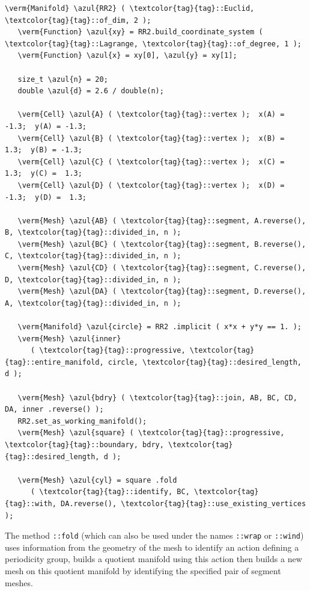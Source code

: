 \begin{Verbatim}[commandchars=\\\{\},formatcom=\small\tt,frame=single,
   label=parag-\ref{\numb section 7.\numb parag 16}.cpp,rulecolor=\color{coment},
   baselinestretch=0.94,framesep=2mm                                             ]
   \verm{Manifold} \azul{RR2} ( \textcolor{tag}{tag}::Euclid, \textcolor{tag}{tag}::of_dim, 2 );
   \verm{Function} \azul{xy} = RR2.build_coordinate_system ( \textcolor{tag}{tag}::Lagrange, \textcolor{tag}{tag}::of_degree, 1 );
   \verm{Function} \azul{x} = xy[0], \azul{y} = xy[1];

   size_t \azul{n} = 20;
   double \azul{d} = 2.6 / double(n);

   \verm{Cell} \azul{A} ( \textcolor{tag}{tag}::vertex );  x(A) = -1.3;  y(A) = -1.3;
   \verm{Cell} \azul{B} ( \textcolor{tag}{tag}::vertex );  x(B) =  1.3;  y(B) = -1.3;
   \verm{Cell} \azul{C} ( \textcolor{tag}{tag}::vertex );  x(C) =  1.3;  y(C) =  1.3;
   \verm{Cell} \azul{D} ( \textcolor{tag}{tag}::vertex );  x(D) = -1.3;  y(D) =  1.3;

   \verm{Mesh} \azul{AB} ( \textcolor{tag}{tag}::segment, A.reverse(), B, \textcolor{tag}{tag}::divided_in, n );
   \verm{Mesh} \azul{BC} ( \textcolor{tag}{tag}::segment, B.reverse(), C, \textcolor{tag}{tag}::divided_in, n );
   \verm{Mesh} \azul{CD} ( \textcolor{tag}{tag}::segment, C.reverse(), D, \textcolor{tag}{tag}::divided_in, n );
   \verm{Mesh} \azul{DA} ( \textcolor{tag}{tag}::segment, D.reverse(), A, \textcolor{tag}{tag}::divided_in, n );

   \verm{Manifold} \azul{circle} = RR2 .implicit ( x*x + y*y == 1. );
   \verm{Mesh} \azul{inner}
      ( \textcolor{tag}{tag}::progressive, \textcolor{tag}{tag}::entire_manifold, circle, \textcolor{tag}{tag}::desired_length, d );

   \verm{Mesh} \azul{bdry} ( \textcolor{tag}{tag}::join, AB, BC, CD, DA, inner .reverse() );
   RR2.set_as_working_manifold();
   \verm{Mesh} \azul{square} ( \textcolor{tag}{tag}::progressive, \textcolor{tag}{tag}::boundary, bdry, \textcolor{tag}{tag}::desired_length, d );

   \verm{Mesh} \azul{cyl} = square .fold
      ( \textcolor{tag}{tag}::identify, BC, \textcolor{tag}{tag}::with, DA.reverse(), \textcolor{tag}{tag}::use_existing_vertices );
\end{Verbatim}

The method {\small\tt{}::fold} (which can also be used under the names
{\small\tt{}::wrap} or {\small\tt{}::wind}) uses information
from the geometry of the mesh to identify an action defining a periodicity group,
builds a quotient manifold using this action then builds a new mesh on this quotient manifold
by identifying the specified pair of segment meshes.

